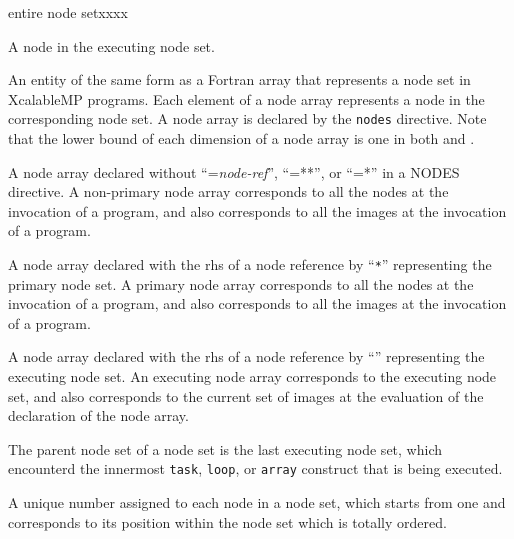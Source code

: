 \begin{namelist}{entire node setxxxx}

 A node in the executing node set.


 An {\XMP} entity of the same form as a Fortran array that represents a
 node set in XcalableMP programs. Each element of a node array
 represents a node in the corresponding node set. A node array is
 declared by the {\tt nodes} directive. Note that the lower bound of
 each dimension of a node array is one in both {\XMPF} and {\XMPC}.




A node array declared without ``={\it node-ref}'', ``=**'', or ``=*''
in a NODES directive.
A non-primary node array corresponds to all the nodes at the invocation of
a program, and also corresponds to all the images at the invocation of
a program.



 A node array declared with the rhs of a node reference by ``{\tt **}''
 representing the primary node set.
 A primary node array corresponds to all the nodes at the invocation of
 a program, and also corresponds to all the images at the invocation of
 a program.


 A node array declared with the rhs of a node reference by ``{\tt *}''
 representing the executing node set.
 An executing node array corresponds to the executing node set, and also
 corresponds to the current set of images at the evaluation of the
 declaration of the node array.


 The parent node set of a node set is the last executing node set, which
 encounterd the innermost {\tt task}, {\tt loop}, or {\tt array}
 construct that is being executed.


 A unique number assigned to each node in a node set, which starts from
 one and corresponds to its position within the node set which is
 totally ordered.

%


\end{namelist}

